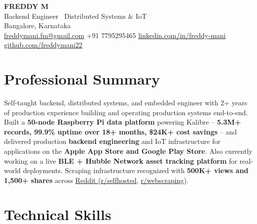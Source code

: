 \documentclass[letterpaper,10.5pt]{article}
\begin{document}
\begin{center}
  {\LARGE \textbf{FREDDY M}}\\[2pt]
  {\small Backend Engineer \textbar\ Distributed Systems \& IoT}\\[2pt]
  Bangalore, Karnataka\\[2pt]
  \href{mailto:freddymani.fm@gmail.com}{freddymani.fm@gmail.com} \quad
  +91 7795295465 \quad
  \href{https://www.linkedin.com/in/freddy-mani/}{linkedin.com/in/freddy-mani} \quad
  \href{https://github.com/freddymani22}{github.com/freddymani22}
\end{center}

\section{Professional Summary}

\small{
Self-taught backend, distributed systems, and embedded engineer with 2+ years of production experience building and operating production systems end-to-end. Built a \textbf{50-node Raspberry Pi data platform} powering Kalibre -- \textbf{5.3M+ records, 99.9\% uptime over 18+ months, \$24K+ cost savings} -- and delivered production \textbf{backend engineering} and IoT infrastructure for applications on the \textbf{Apple App Store and Google Play Store}. Also currently working on a live \textbf{BLE + Hubble Network asset tracking platform} for real-world deployments. Scraping infrastructure recognized with \textbf{500K+ views and 1,500+ shares} across \href{https://www.reddit.com/r/selfhosted/comments/1rsflyj/fully_selfhosted_distributed_scraping/}{Reddit (r/selfhosted}, \href{https://www.reddit.com/r/webscraping/comments/1rqsvgp/python_selenium_at_scale_50_nodes_39m_records/}{r/webscraping)}.
}

\section{Technical Skills}
\end{document}
